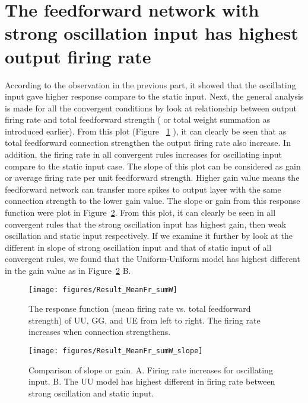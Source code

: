\section{The feedforward network with strong oscillation input has highest output firing rate}
 According to the observation in the previous part, it showed that the oscillating input gave higher response compare to the static input. Next, the general analysis is made for all the convergent conditions by look at relationship between output firing rate and total feedforward strength ( or total weight summation as introduced earlier).  From this plot (Figure ~\ref{fig:ResFun} ), it can clearly be seen that as total feedforward connection strengthen the output firing rate also increase.
 In addition, the firing rate in all convergent rules increases for oscillating input compare to the static input case. The slope of this plot can be considered as gain or average firing rate per unit feedforward strength.  Higher gain value means the feedforward network can transfer more spikes to output layer with the same connection strength to the lower gain value. The slope or gain from this response function were plot in Figure~\ref{fig:ResFunDiff}. From this plot, it can  clearly be  seen in all convergent rules that the strong oscillation  input has highest gain, then weak oscillation and static input respectively.  If we examine it further by look at the different in slope of strong oscillation input and that of static input of all convergent rules, we found that the Uniform-Uniform model has highest different in the gain value as in Figure~\ref{fig:ResFunDiff} B. 


\begin{figure}[!h]
	\centering
	\texttt{[image: figures/Result\_MeanFr\_sumW]}
	\caption{The response function (mean firing rate vs. total feedforward strength) of UU, GG, and UE from left to right. The firing rate increases when connection strengthens.}
	\label{fig:ResFun}
\end{figure}


\begin{figure}[!h]
	\centering
	\texttt{[image: figures/Result\_MeanFr\_sumW\_slope]}
	\caption{Comparison of slope or gain. A. Firing rate increases for oscillating input. B. The UU model has highest different in firing rate between strong oscillation and static input.}
	\label{fig:ResFunDiff}
\end{figure}



